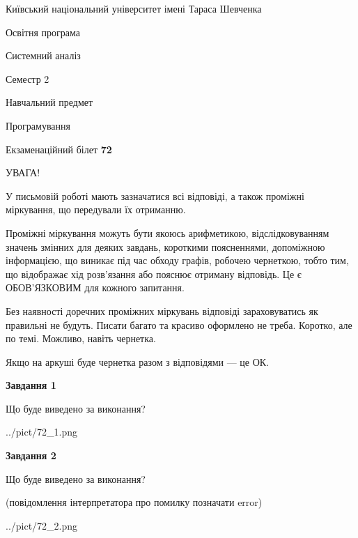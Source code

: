 \documentclass[12pt, ukrainian]{article}
\begin{document}
{{\begin {small}\par
{ \center  Київський національний університет імені Тараса Шевченка \par}
{\parbox {5 cm}{Освітня програма \hfill}{\parbox {7 cm}{Системний аналіз \hfill}}\parbox {6 cm}{\hfill Семестр 2}}\par
{\parbox {5 cm} {Навчальний предмет \hfill}\parbox {7 cm}{Програмування \hfill}\parbox {6cm}{\hfill}\par}\vspace{-7pt} \end{small}}{\center Екзаменаційний білет \No \textbf
{ 72 }\par}}
{
\begin {large}
УВАГА!

У письмовій роботі мають зазначатися всі відповіді, а також проміжні міркування, що передували їх отриманню.

Проміжні міркування можуть бути якоюсь арифметикою, відслідковуванням зна\-чень змінних для деяких завдань,
короткими поясненнями, допоміжною інформацією, що виникає під час обходу графів, робочею чернеткою,
тобто тим, що відображає хід розв’язання або пояснює отриману відповідь.
Це є ОБОВ’ЯЗКОВИМ для кожного запитання.

Без наявності доречних проміжних міркувань відповіді зараховуватись як правиль\-ні не будуть.
Писати багато та красиво оформлено не треба. Коротко, але по темі. Можли\-во, навіть чернетка.

Якщо на аркуші буде чернетка разом з відповідями --- це ОК.

\newpage

{\begin {center}\textbf{Завдання 1}\end {center}}\par
Що буде виведено за виконання?\par
\begin{center}
	{../pict/72_1.png}
\end{center}
\newpage

{\begin {center}\textbf{Завдання 2}\end {center}}\par
Що буде виведено за виконання?\par
 (повідомлення інтерпретатора про помилку позначати error)\par
\begin{center}
	{../pict/72_2.png}
\end{center}
\newpage


\end{large}}
\end{document}
